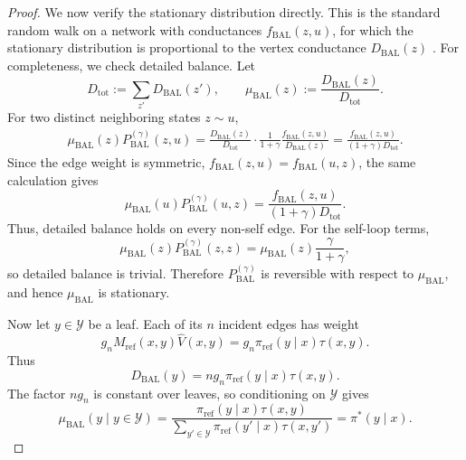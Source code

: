 \documentclass{article}
\numberwithin{theorem}{section}
\numberwithin{proposition}{section}
\numberwithin{corollary}{section}
\numberwithin{lemma}{section}
\numberwithin{conjecture}{section}
\numberwithin{remark}{section}
\numberwithin{definition}{section}
\numberwithin{assumption}{section}
\numberwithin{example}{section}
\newcommand{\calY}{{\mathcal{Y}}}
\providecommand{\base}{\pi_{\mathrm{ref}}}
\begin{document}
\begin{proof}
We now verify the stationary distribution directly. This is the standard random walk on a network with conductances $f_{\mathrm{BAL}}(z,u)$, for which the stationary distribution is proportional to the vertex conductance $D_{\mathrm{BAL}}(z)$ \citep{levin2017markov}. For completeness, we check detailed balance. Let
\begin{equation*}
    D_{\mathrm{tot}}:=\sum_{z'}D_{\mathrm{BAL}}(z'), \qquad
    \mu_{\mathrm{BAL}}(z):=\frac{D_{\mathrm{BAL}}(z)}{D_{\mathrm{tot}}}.
\end{equation*}
For two distinct neighboring states $z\sim u$,
\begin{align*}
    \mu_{\mathrm{BAL}}(z)P_{\mathrm{BAL}}^{(\gamma)}(z,u)
    =
    \frac{D_{\mathrm{BAL}}(z)}{D_{\mathrm{tot}}}
    \cdot
    \frac{1}{1+\gamma}
    \frac{f_{\mathrm{BAL}}(z,u)}{D_{\mathrm{BAL}}(z)} =
    \frac{f_{\mathrm{BAL}}(z,u)}{(1+\gamma)D_{\mathrm{tot}}}.
\end{align*}
Since the edge weight is symmetric, $f_{\mathrm{BAL}}(z,u)=f_{\mathrm{BAL}}(u,z)$, the same calculation gives
\begin{equation*}
    \mu_{\mathrm{BAL}}(u)P_{\mathrm{BAL}}^{(\gamma)}(u,z)=\frac{f_{\mathrm{BAL}}(z,u)}{(1+\gamma)D_{\mathrm{tot}}}.
\end{equation*}
Thus, detailed balance holds on every non-self edge. For the self-loop terms,
\begin{equation*}
    \mu_{\mathrm{BAL}}(z)P_{\mathrm{BAL}}^{(\gamma)}(z,z)=\mu_{\mathrm{BAL}}(z)\frac{\gamma}{1+\gamma},
\end{equation*}
so detailed balance is trivial. Therefore $P_{\mathrm{BAL}}^{(\gamma)}$ is reversible with respect to $\mu_{\mathrm{BAL}}$, and hence $\mu_{\mathrm{BAL}}$ is stationary.

Now let $y\in\calY$ be a leaf. Each of its $n$ incident edges has weight
\begin{equation*}
    g_n M_{\text{ref}}(x,y)\widehat V(x,y)=g_n \base(y\mid x)\tau(x,y).
\end{equation*}
Thus
\begin{equation*}
    D_{\mathrm{BAL}}(y)=n g_n \base(y\mid x)\tau(x,y).
\end{equation*}
The factor $n g_n$ is constant over leaves, so conditioning on $\calY$ gives
\begin{equation*}
    \mu_{\mathrm{BAL}}(y\mid y\in\calY)
    =
    \frac{\base(y\mid x)\tau(x,y)}
    {\sum_{y'\in\calY}\base(y'\mid x)\tau(x,y')}
    =
    \pi^*(y\mid x).
\end{equation*}
\end{proof}
\end{document}
